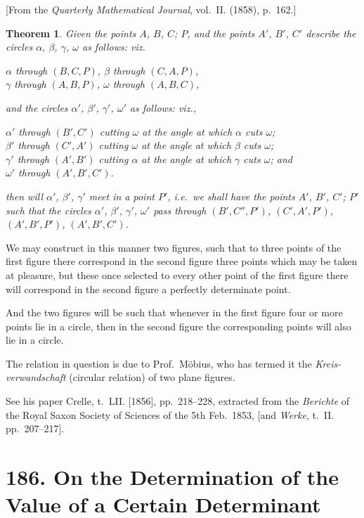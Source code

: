 \documentclass[12pt,a4paper]{article}
\theoremstyle{plain}
\newtheorem{theorem}{Theorem}
\theoremstyle{definition}
\begin{document}
[From the \textit{Quarterly Mathematical Journal}, vol.~II. (1858), p.~162.]

\begin{theorem}
Given the points $A$, $B$, $C$; $P$, and the points $A'$, $B'$, $C'$ describe the circles $\alpha$, $\beta$, $\gamma$, $\omega$ as follows: viz.
\begin{center}
$\alpha$ through $(B, C, P)$, \quad $\beta$ through $(C, A, P)$, \\
$\gamma$ through $(A, B, P)$, \quad $\omega$ through $(A, B, C)$,
\end{center}
and the circles $\alpha'$, $\beta'$, $\gamma'$, $\omega'$ as follows: viz.,
\begin{center}
$\alpha'$ through $(B', C')$ cutting $\omega$ at the angle at which $\alpha$ cuts $\omega$; \\
$\beta'$ through $(C', A')$ cutting $\omega$ at the angle at which $\beta$ cuts $\omega$; \\
$\gamma'$ through $(A', B')$ cutting $\alpha$ at the angle at which $\gamma$ cuts $\omega$; and \\
$\omega'$ through $(A', B', C')$.
\end{center}
then will $\alpha'$, $\beta'$, $\gamma'$ meet in a point $P'$, i.e.\ we shall have the points $A'$, $B'$, $C'$; $P'$ such that the circles $\alpha'$, $\beta'$, $\gamma'$, $\omega'$ pass through $(B', C'', P')$, $(C', A', P')$, $(A', B', P')$, $(A', B', C')$.
\end{theorem}

We may construct in this manner two figures, such that to three points of the first figure there correspond in the second figure three points which may be taken at pleasure, but these once selected to every other point of the first figure there will correspond in the second figure a perfectly determinate point.

And the two figures will be such that whenever in the first figure four or more points lie in a circle, then in the second figure the corresponding points will also lie in a circle.

The relation in question is due to Prof.\ M\"{o}bius, who has termed it the \textit{Kreis-verwandschaft} (circular relation) of two plane figures.

See his paper Crelle, t.~LII. [1856], pp.~218--228, extracted from the \textit{Berichte} of the Royal Saxon Society of Sciences of the 5th Feb.\ 1853, [and \textit{Werke}, t.~II. pp.~207--217].


\newpage
\section*{186. On the Determination of the Value of a Certain Determinant}
\end{document}
